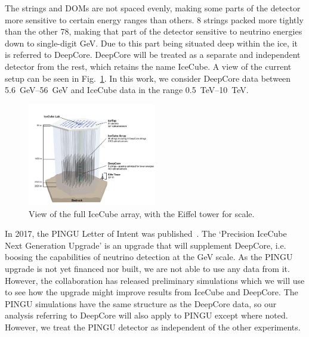 The strings and DOMs are not spaced evenly, making some parts of the detector more sensitive to certain energy ranges than others.
8 strings packed more tightly than the other 78, making that part of the detector sensitive to neutrino energies down to single-digit \si{\GeV}. Due to 
this part being situated deep within the ice, it is referred to DeepCore. DeepCore will be treated as a separate and independent detector from the rest, which
retains the name IceCube. A view of the current setup can be seen in Fig.~\ref{fig:array}. In this work, we consider DeepCore data between \SIrange{5.6}{56}{\GeV} and IceCube data in the range \SIrange{0.5}{10}{\TeV}.
\begin{figure}\label{fig:array}
    \centering
    \includegraphics[width=0.5\textwidth]{figures/icecube2.png}
    \caption{View of the full IceCube array, with the Eiffel tower for scale.}
\end{figure}

In 2017, the PINGU Letter of Intent was published~\cite{PINGUletter}. The `Precision IceCube Next Generation Upgrade' is an upgrade that will 
supplement DeepCore, i.e. boosing the capabilities of neutrino detection at the \si{\GeV} scale. As the PINGU upgrade is not yet financed nor built, we are
not able to use any data from it. However, the collaboration has released preliminary simulations which we will use to see how the upgrade might improve
results from IceCube and DeepCore. The PINGU simulations have the same structure as the DeepCore data, so our analysis referring to DeepCore will
also apply to PINGU except where noted. However, we treat the PINGU detector as independent of the other experiments.


